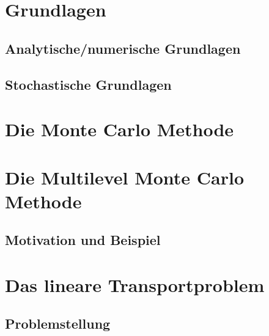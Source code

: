 \documentclass[12pt,a4paper]{scrartcl}
\theoremstyle{definition}
\numberwithin{equation}{section}
\begin{document}
 \newpage  %
 
\section{Grundlagen}
\subsection{Analytische/numerische Grundlagen}

\newpage  %
\subsection{Stochastische Grundlagen}

\newpage  %
\section{Die Monte Carlo Methode}
\label{MC}

\newpage  %
\section{Die Multilevel Monte Carlo Methode}
\label{MLMC}
\subsection{Motivation und Beispiel}


\newpage  %

\section{Das lineare Transportproblem}
\label{TP}
\subsection{Problemstellung}
 
 \newpage  %
\end{document}
